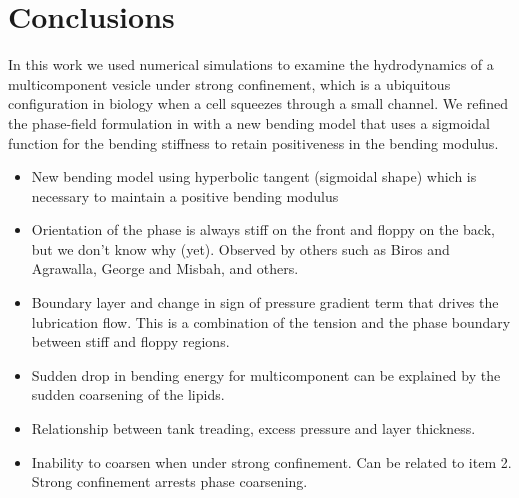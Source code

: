 \documentclass[twoside,twocolumn,9pt]{article}
\begin{document}




\section{Conclusions \label{sec:conclusion}}
In this work we used numerical simulations to examine the hydrodynamics of a multicomponent vesicle under strong confinement, which is a ubiquitous configuration in biology when a cell squeezes through a small channel. We refined the phase-field formulation in \citet{liu-mar-li-vee-low2017} with a new bending model that uses a sigmoidal function for the bending stiffness to retain positiveness in the bending modulus.

\begin{itemize}
  \item New bending model using hyperbolic tangent (sigmoidal shape)
    which is necessary to maintain a positive bending modulus

  \item Orientation of the phase is always stiff on the front and floppy
    on the back, but we don't know why (yet). Observed by others such as
    Biros and Agrawalla, George and Misbah, and others.

  \item Boundary layer and change in sign of pressure gradient term that
    drives the lubrication flow. This is a combination of the tension
    and the phase boundary between stiff and floppy regions.

  \item Sudden drop in bending energy for multicomponent can be
    explained by the sudden coarsening of the lipids.

  \item Relationship between tank treading, excess pressure and layer
    thickness.

  \item  Inability to coarsen when under strong confinement. Can be
    related to item 2. Strong confinement arrests phase coarsening.

\end{itemize}
\end{document}
